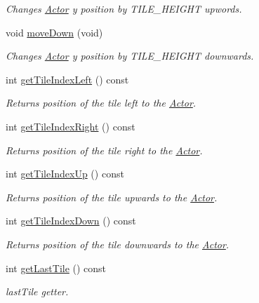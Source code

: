 \begin{DoxyCompactItemize}
\begin{DoxyCompactList}\small\item\em Changes \mbox{\hyperlink{class_actor}{Actor}} y position by T\+I\+L\+E\+\_\+\+H\+E\+I\+G\+HT upwords. \end{DoxyCompactList}\item 
void \mbox{\hyperlink{class_actor_abc0ed5cc187310fef30b4b9a94252e17}{move\+Down}} (void)
\begin{DoxyCompactList}\small\item\em Changes \mbox{\hyperlink{class_actor}{Actor}} y position by T\+I\+L\+E\+\_\+\+H\+E\+I\+G\+HT downwards. \end{DoxyCompactList}\item 
int \mbox{\hyperlink{class_actor_a0f751e7ea9030b58a8db19ccc62214f3}{get\+Tile\+Index\+Left}} () const
\begin{DoxyCompactList}\small\item\em Returns position of the tile left to the \mbox{\hyperlink{class_actor}{Actor}}. \end{DoxyCompactList}\item 
int \mbox{\hyperlink{class_actor_ac54394e212a1a1f51ae82202a8144421}{get\+Tile\+Index\+Right}} () const
\begin{DoxyCompactList}\small\item\em Returns position of the tile right to the \mbox{\hyperlink{class_actor}{Actor}}. \end{DoxyCompactList}\item 
int \mbox{\hyperlink{class_actor_a92a718240f1b2b51e2f0dee763435f58}{get\+Tile\+Index\+Up}} () const
\begin{DoxyCompactList}\small\item\em Returns position of the tile upwards to the \mbox{\hyperlink{class_actor}{Actor}}. \end{DoxyCompactList}\item 
int \mbox{\hyperlink{class_actor_a78388b58a561143504ff722a6625b564}{get\+Tile\+Index\+Down}} () const
\begin{DoxyCompactList}\small\item\em Returns position of the tile downwards to the \mbox{\hyperlink{class_actor}{Actor}}. \end{DoxyCompactList}\item 
int \mbox{\hyperlink{class_actor_a7867adac1be8ea6273808dda395a4170}{get\+Last\+Tile}} () const
\begin{DoxyCompactList}\small\item\em last\+Tile getter. \end{DoxyCompactList}\item 

\end{DoxyCompactItemize}
